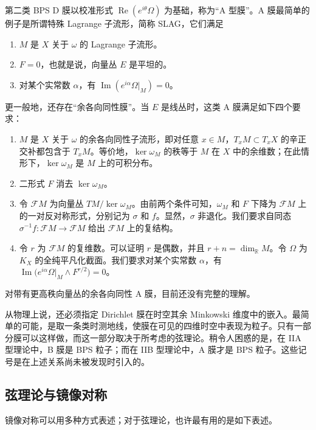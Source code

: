 第二类 BPS D 膜以校准形式 $\operatorname{Re}(e^{i\theta}\Omega)$ 为基础，称为“A 型膜”。A 膜最简单的例子是所谓特殊 Lagrange 子流形，简称 SLAG，它们满足
\begin{enumerate}[label=(\arabic*)]
\item $M$ 是 $X$ 关于 $\omega$ 的 Lagrange 子流形。
\item $F=0$，也就是说，向量丛 $E$ 是平坦的。
\item 对某个实常数 $\alpha$，有 $\operatorname{Im}(e^{i\alpha}\Omega|_M)=0$。
\end{enumerate}

更一般地，还存在“余各向同性膜”。当 $E$ 是线丛时，这类 A 膜满足如下四个要求：
\begin{enumerate}[label=(\arabic*)]
\item $M$ 是 $X$ 关于 $\omega$ 的余各向同性子流形，即对任意 $x\in M$，$T_xM\subset T_xX$ 的辛正交补都包含于 $T_xM$。等价地，$\ker\omega_M$ 的秩等于 $M$ 在 $X$ 中的余维数；在此情形下，$\ker\omega_M$ 是 $M$ 上的可积分布。
\item 二形式 $F$ 消去 $\ker\omega_M$。
\item 令 $\mathcal{F}M$ 为向量丛 $TM/\ker\omega_M$。由前两个条件可知，$\omega_M$ 和 $F$ 下降为 $\mathcal{F}M$ 上的一对反对称形式，分别记为 $\sigma$ 和 $f$。显然，$\sigma$ 非退化。我们要求自同态 $\sigma^{-1}f\colon\mathcal{F}M\to\mathcal{F}M$ 给出 $\mathcal{F}M$ 上的复结构。
\item 令 $r$ 为 $\mathcal{F}M$ 的复维数。可以证明 $r$ 是偶数，并且 $r+n=\dim_{\mathbb{R}}M$。令 $\Omega$ 为 $K_X$ 的全纯平凡化截面。我们要求对某个实常数 $\alpha$，有 $\operatorname{Im}\bigl(e^{i\alpha}\Omega|_M\wedge F^{r/2}\bigr)=0$。
\end{enumerate}
对带有更高秩向量丛的余各向同性 A 膜，目前还没有完整的理解。

从物理上说，还必须指定 Dirichlet 膜在时空其余 Minkowski 维度中的嵌入。最简单的可能，是取一条类时测地线，使膜在可见的四维时空中表现为粒子。只有一部分膜可以这样做，而这一部分取决于所考虑的弦理论。稍令人困惑的是，在 IIA 型理论中，B 膜是 BPS 粒子；而在 IIB 型理论中，A 膜才是 BPS 粒子。这些记号是在上述关系尚未被发现时引入的。

\subsection{弦理论与镜像对称}\label{sec:1.1.5}

镜像对称可以用多种方式表述；对于弦理论，也许最有用的是如下表述。

